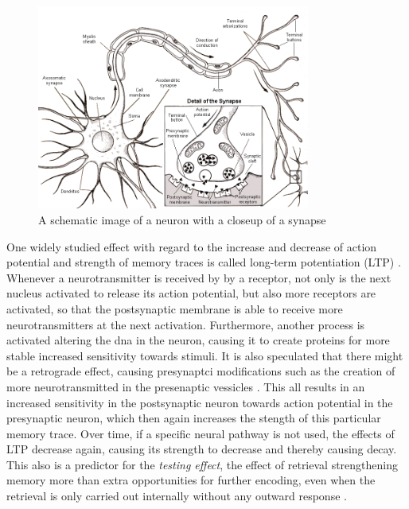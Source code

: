 \begin{figure}
    \centering
    \includegraphics[width=0.8\textwidth]{img/neuron.png}
    \caption{A schematic image of a neuron with a closeup of a synapse \protect\cite{website:neuron}}
    \label{fig:neuron}
\end{figure}

One widely studied effect with regard to the increase and decrease of action potential and strength of memory traces is called long-term potentiation (LTP) \cite{cognitivepsychology, longtermpotentiation, activationbasedmodel, amnesia}. Whenever a neurotransmitter is received by by a receptor, not only is the next nucleus activated to release its action potential, but also more receptors are activated, so that the postsynaptic membrane is able to receive more neurotransmitters at the next activation. Furthermore, another process is activated altering the dna in the neuron, causing it to create proteins for more stable increased sensitivity towards stimuli. It is also speculated that there might be a retrograde effect, causing presynaptci modifications such as the creation of more neurotransmitted in the presenaptic vessicles \cite{longtermpotentiation}. This all results in an increased sensitivity in the postsynaptic neuron towards action potential in the presynaptic neuron, which then again increases the stength of this particular memory trace. Over time, if a specific neural pathway is not used, the effects of LTP decrease again, causing its strength to decrease and thereby causing decay. This also is a predictor for the \emph{testing effect}, the effect of retrieval strengthening memory more than extra opportunities for further encoding, even when the retrieval is only carried out internally without any outward response \cite{microlearning}.

